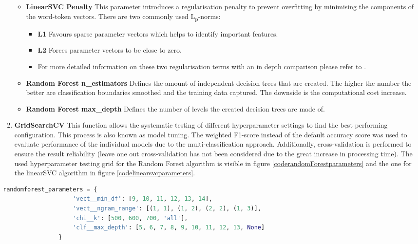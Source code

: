 \begin{enumerate}
\begin{itemize}[label={}]
        \item \textbf{LinearSVC Penalty} This parameter introduces a regularisation penalty to prevent overfitting by minimising the components of the word-token vectors. There are two commonly used L\textsubscript{p}-norms:
        \begin{itemize}[label={}]
            \item \textbf{L1} Favours sparse parameter vectors which helps to identify important features.
            \item \textbf{L2} Forces parameter vectors to be close to zero.
            \item For more detailed information on these two regularisation terms with an in depth comparison please refer to \textcite{Mazilu2011}.
        \end{itemize}
        
        \item \textbf{Random Forest n\_estimators} Defines the amount of independent decision trees that are created. The higher the number the better are classification boundaries smoothed and the training data captured. The downside is the computational cost increase.
        
        \item \textbf{Random Forest max\_depth} Defines the number of levels the created decision trees are made of.
    \end{itemize}
    
    \item \textbf{GridSearchCV} This function allows the systematic testing of different hyperparameter settings to find the best performing configuration. This process is also known as model tuning. The weighted F1-score instead of the default accuracy score was used to evaluate performance of the individual models due to the multi-classification approach. Additionally, cross-validation is performed to ensure the result reliability (leave one out cross-validation has not been considered due to the great increase in processing time). The used hyperparameter testing grid for the Random Forest algorithm is visible in figure \ref{coderandomForestparameters} and the one for the linearSVC algorithm in figure \ref{codelinearsvcparameters}.
\end{enumerate}

\begin{lstlisting}[language=Python, caption=Tuned hyperparameters of the Random Forest fitting algorithm, label=coderandomForestparameters]
randomforest_parameters = {
                    'vect__min_df': [9, 10, 11, 12, 13, 14],
                    'vect__ngram_range': [(1, 1), (1, 2), (2, 2), (1, 3)],
                    'chi__k': [500, 600, 700, 'all'],
                    'clf__max_depth': [5, 6, 7, 8, 9, 10, 11, 12, 13, None]
                }
\end{lstlisting}

